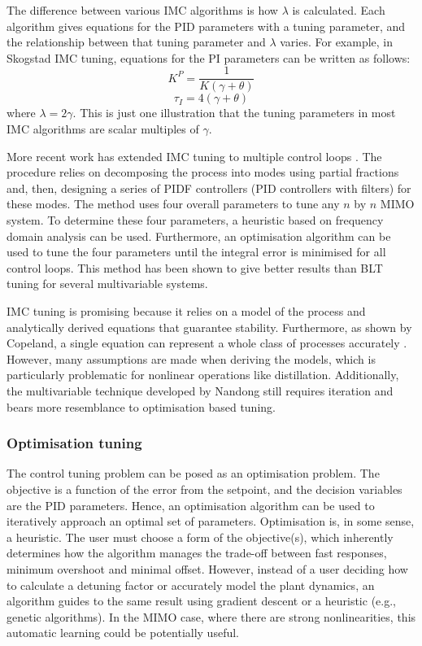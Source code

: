 The difference between various IMC algorithms is how $\lambda$ is calculated. Each algorithm gives equations for the PID parameters with a tuning parameter, and the relationship between that tuning parameter and $\lambda$ varies. For example, in Skogstad IMC tuning, equations for the PI parameters can be written as follows\cite{Copeland2010}: 
\begin{equation}
    K^P = \frac{1}{K(\gamma +\theta)}
\end{equation}
\begin{equation}
    \tau_I = 4(\gamma+\theta)
\end{equation}
where $\lambda=2\gamma$. This is just one illustration that the tuning parameters in most IMC algorithms are scalar multiples of $\gamma$.

More recent work has extended IMC tuning to multiple control loops \cite{Nandong2013, Nandong2015}. The procedure relies on decomposing the process into modes using partial fractions and, then, designing a series of PIDF controllers (PID controllers with filters) for these modes. The method uses four overall parameters to tune any $n$ by $n$ MIMO system. To determine these four parameters, a heuristic based on frequency domain analysis can be used. Furthermore, an optimisation algorithm can be used to tune the four parameters until the integral error is minimised for all control loops. This method has been shown to give better results than BLT tuning for several  multivariable systems.  

IMC tuning is promising because it relies on a model of the process and analytically derived equations that guarantee stability. Furthermore, as shown by Copeland, a single equation can represent a whole class of processes accurately \cite{Copeland2010}. However, many assumptions are made when deriving the models, which is particularly problematic for nonlinear operations like distillation. Additionally, the multivariable technique developed by Nandong\cite{Nandong2015} still requires iteration and bears more resemblance to optimisation based tuning.

\subsubsection{Optimisation tuning}
The control tuning problem can be posed as an optimisation problem.  The objective is a function of the error from the setpoint\cite{Pajares2019, Sumana2010, Rajapandiyan2012, Behroozsarand2012}, and the decision variables  are the PID parameters.  Hence, an optimisation algorithm can be used to iteratively approach an optimal set of parameters. Optimisation is, in some sense, a heuristic. The user must choose a form of the objective(s), which inherently determines how the algorithm manages the trade-off between fast responses, minimum overshoot and minimal offset. However, instead of a user deciding how to calculate a detuning factor or accurately model the plant dynamics, an algorithm guides to the same result using gradient descent or a heuristic (e.g., genetic algorithms). In the MIMO case, where there are strong nonlinearities, this automatic learning could be potentially useful. 

